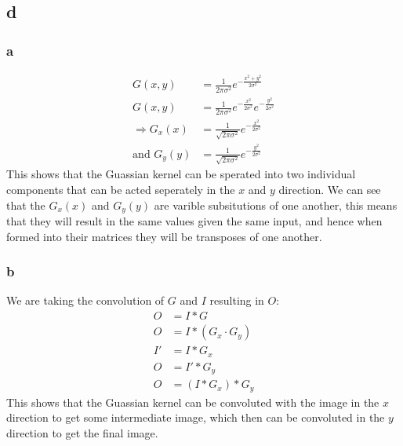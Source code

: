 \documentclass[11pt]{article}
\begin{document}
\subsection{d}
\label{sec:orga8d1b24}
\subsubsection{a}
\label{sec:org2a74310}
\begin{align*}
G(x,y)&=\frac{1}{2\pi \sigma^{2}}e^{-\frac{x^2+y^2}{2 \sigma^2}} \\
G(x,y)&=\frac{1}{2\pi \sigma^{2}}e^{-\frac{x^2}{2 \sigma^2}}e^{-\frac{y^2}{2 \sigma^2}} \\
\Rightarrow G_x(x)&=\frac{1}{\sqrt{2\pi \sigma^{2}}}e^{-\frac{x^2}{2 \sigma^2}} \\
\textrm{and } G_y(y)&=\frac{1}{\sqrt{2\pi \sigma^{2}}}e^{-\frac{y^2}{2 \sigma^2}}
\end{align*}
This shows that the Guassian kernel can be sperated into two individual components that can be acted seperately in the \(x\) and \(y\) direction. We can see that the \(G_x(x)\) and \(G_y(y)\) are varible subsitutions of one another, this means that they will result in the same values given the same input, and hence when formed into their matrices they will be transposes of one another.
\subsubsection{b}
\label{sec:org065df75}
We are taking the convolution of \(G\) and \(I\) resulting in \(O\):
\begin{align*}
O&=I*G                     \\
O&=I*(G_x\cdot G_y)        \\
I'&=I*G_x                  \\
O&=I'* G_y                 \\
O&=(I*G_x)*G_y
\end{align*}
This shows that the Guassian kernel can be convoluted with the image in the \(x\) direction to get some intermediate image, which then can be convoluted in the \(y\) direction to get the final image.
\end{document}
